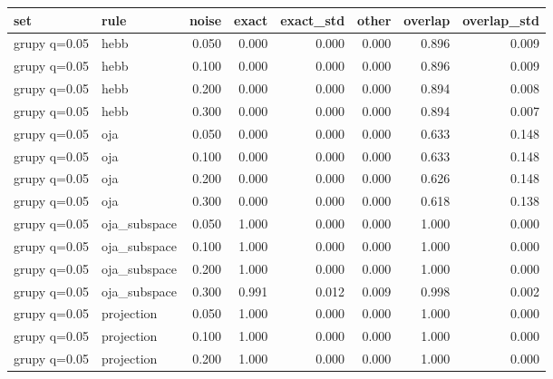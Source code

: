 \begin{tabular}{llrrrrrr}

\toprule

set & rule & noise & exact & exact\_std & other & overlap & overlap\_std \\

\midrule

grupy q=0.05 & hebb & 0.050 & 0.000 & 0.000 & 0.000 & 0.896 & 0.009 \\

grupy q=0.05 & hebb & 0.100 & 0.000 & 0.000 & 0.000 & 0.896 & 0.009 \\

grupy q=0.05 & hebb & 0.200 & 0.000 & 0.000 & 0.000 & 0.894 & 0.008 \\

grupy q=0.05 & hebb & 0.300 & 0.000 & 0.000 & 0.000 & 0.894 & 0.007 \\

grupy q=0.05 & oja & 0.050 & 0.000 & 0.000 & 0.000 & 0.633 & 0.148 \\

grupy q=0.05 & oja & 0.100 & 0.000 & 0.000 & 0.000 & 0.633 & 0.148 \\

grupy q=0.05 & oja & 0.200 & 0.000 & 0.000 & 0.000 & 0.626 & 0.148 \\

grupy q=0.05 & oja & 0.300 & 0.000 & 0.000 & 0.000 & 0.618 & 0.138 \\

grupy q=0.05 & oja\_subspace & 0.050 & 1.000 & 0.000 & 0.000 & 1.000 & 0.000 \\

grupy q=0.05 & oja\_subspace & 0.100 & 1.000 & 0.000 & 0.000 & 1.000 & 0.000 \\

grupy q=0.05 & oja\_subspace & 0.200 & 1.000 & 0.000 & 0.000 & 1.000 & 0.000 \\

grupy q=0.05 & oja\_subspace & 0.300 & 0.991 & 0.012 & 0.009 & 0.998 & 0.002 \\

grupy q=0.05 & projection & 0.050 & 1.000 & 0.000 & 0.000 & 1.000 & 0.000 \\

grupy q=0.05 & projection & 0.100 & 1.000 & 0.000 & 0.000 & 1.000 & 0.000 \\

grupy q=0.05 & projection & 0.200 & 1.000 & 0.000 & 0.000 & 1.000 & 0.000 \\


\end{tabular}
